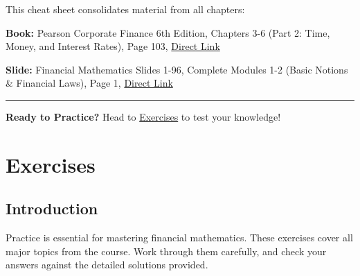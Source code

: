 \documentclass[
  letterpaper,
]{scrbook}
\begin{document}
\begin{tcolorbox}[enhanced jigsaw, toptitle=1mm, colbacktitle=quarto-callout-caution-color!10!white, opacityback=0, leftrule=.75mm, breakable, colframe=quarto-callout-caution-color-frame, toprule=.15mm, opacitybacktitle=0.6, coltitle=black, bottomrule=.15mm, colback=white, arc=.35mm, titlerule=0mm, rightrule=.15mm, left=2mm, title=\textcolor{quarto-callout-caution-color}{\faFire}\hspace{0.5em}{References}, bottomtitle=1mm]

This cheat sheet consolidates material from all chapters:

\textbf{Book:} Pearson Corporate Finance 6th Edition, Chapters 3-6 (Part
2: Time, Money, and Interest Rates), Page 103,
\href{https://cdn.jsdelivr.net/gh/mrbungie/financial_maths@main/resources/books/pearson_corporate_finance_6th.pdf\#page=103}{Direct
Link}

\textbf{Slide:} Financial Mathematics Slides 1-96, Complete Modules 1-2
(Basic Notions \& Financial Laws), Page 1,
\href{https://cdn.jsdelivr.net/gh/mrbungie/financial_maths@main/resources/slideshows/25_09_30_FinancialMathematics_Slides_1_96.pdf\#page=1}{Direct
Link}

\end{tcolorbox}

\begin{center}\rule{0.5\linewidth}{0.5pt}\end{center}

\textbf{Ready to Practice?} Head to \href{exercises.qmd}{Exercises} to
test your knowledge!


\chapter{Exercises}\label{exercises}

\section{Introduction}\label{introduction-4}

Practice is essential for mastering financial mathematics. These
exercises cover all major topics from the course. Work through them
carefully, and check your answers against the detailed solutions
provided.
\end{document}
